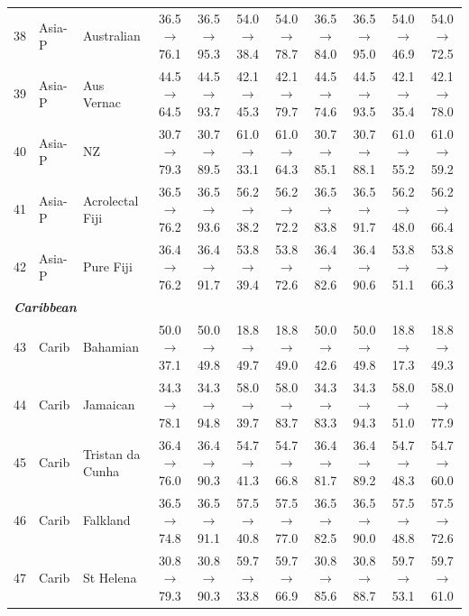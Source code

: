 \begin{table}[t]
{\begin{tabular}{rll c c c c c c c c}
38 & Asia-P & Australian & 36.5$\rightarrow$76.1 & 36.5$\rightarrow$95.3 & 54.0$\rightarrow$38.4 & 54.0$\rightarrow$78.7 & 36.5$\rightarrow$84.0 & 36.5$\rightarrow$95.0 & 54.0$\rightarrow$46.9 & 54.0$\rightarrow$72.5 \\
39 & Asia-P & Aus Vernac & 44.5$\rightarrow$64.5 & 44.5$\rightarrow$93.7 & 42.1$\rightarrow$45.3 & 42.1$\rightarrow$79.7 & 44.5$\rightarrow$74.6 & 44.5$\rightarrow$93.5 & 42.1$\rightarrow$35.4 & 42.1$\rightarrow$78.0 \\
40 & Asia-P & NZ & 30.7$\rightarrow$79.3 & 30.7$\rightarrow$89.5 & 61.0$\rightarrow$33.1 & 61.0$\rightarrow$64.3 & 30.7$\rightarrow$85.1 & 30.7$\rightarrow$88.1 & 61.0$\rightarrow$55.2 & 61.0$\rightarrow$59.2 \\
41 & Asia-P & Acrolectal Fiji & 36.5$\rightarrow$76.2 & 36.5$\rightarrow$93.6 & 56.2$\rightarrow$38.2 & 56.2$\rightarrow$72.2 & 36.5$\rightarrow$83.8 & 36.5$\rightarrow$91.7 & 56.2$\rightarrow$48.0 & 56.2$\rightarrow$66.4 \\
42 & Asia-P & Pure Fiji & 36.4$\rightarrow$76.2 & 36.4$\rightarrow$91.7 & 53.8$\rightarrow$39.4 & 53.8$\rightarrow$72.6 & 36.4$\rightarrow$82.6 & 36.4$\rightarrow$90.6 & 53.8$\rightarrow$51.1 & 53.8$\rightarrow$66.3 \\
\midrule
\multicolumn{11}{l}{\textit{\textbf{Caribbean}}} \\
43 & Carib & Bahamian & 50.0$\rightarrow$37.1 & 50.0$\rightarrow$49.8 & 18.8$\rightarrow$49.7 & 18.8$\rightarrow$49.0 & 50.0$\rightarrow$42.6 & 50.0$\rightarrow$49.8 & 18.8$\rightarrow$17.3 & 18.8$\rightarrow$49.3 \\
44 & Carib & Jamaican & 34.3$\rightarrow$78.1 & 34.3$\rightarrow$94.8 & 58.0$\rightarrow$39.7 & 58.0$\rightarrow$83.7 & 34.3$\rightarrow$83.3 & 34.3$\rightarrow$94.3 & 58.0$\rightarrow$51.0 & 58.0$\rightarrow$77.9 \\
45 & Carib & Tristan da Cunha & 36.4$\rightarrow$76.0 & 36.4$\rightarrow$90.3 & 54.7$\rightarrow$41.3 & 54.7$\rightarrow$66.8 & 36.4$\rightarrow$81.7 & 36.4$\rightarrow$89.2 & 54.7$\rightarrow$48.3 & 54.7$\rightarrow$60.0 \\
46 & Carib & Falkland & 36.5$\rightarrow$74.8 & 36.5$\rightarrow$91.1 & 57.5$\rightarrow$40.8 & 57.5$\rightarrow$77.0 & 36.5$\rightarrow$82.5 & 36.5$\rightarrow$90.0 & 57.5$\rightarrow$48.8 & 57.5$\rightarrow$72.6 \\
47 & Carib & St Helena & 30.8$\rightarrow$79.3 & 30.8$\rightarrow$90.3 & 59.7$\rightarrow$33.8 & 59.7$\rightarrow$66.9 & 30.8$\rightarrow$85.6 & 30.8$\rightarrow$88.7 & 59.7$\rightarrow$53.1 & 59.7$\rightarrow$61.0 \\

\end{tabular}}
\end{table}

